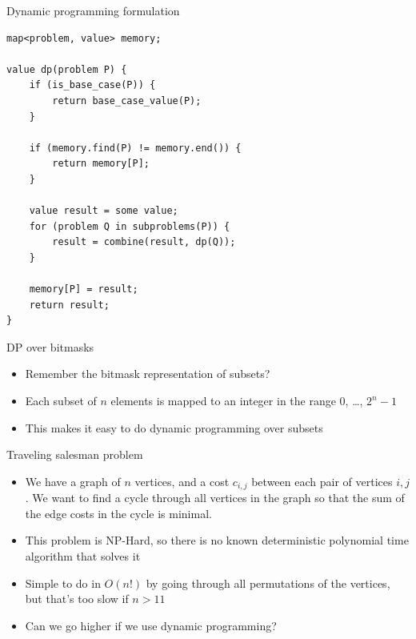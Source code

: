 \documentclass{beamer}
\begin{document}
\begin{frame}{Dynamic programming formulation}
    \begin{verbatim}
map<problem, value> memory;

value dp(problem P) {
    if (is_base_case(P)) {
        return base_case_value(P);
    }

    if (memory.find(P) != memory.end()) {
        return memory[P];
    }

    value result = some value;
    for (problem Q in subproblems(P)) {
        result = combine(result, dp(Q));
    }

    memory[P] = result;
    return result;
}
    \end{verbatim}
\end{frame}


\begin{frame}[plain]{DP over bitmasks}
    \vspace{40pt}
    \begin{itemize}
        \item Remember the bitmask representation of subsets?
        \item Each subset of $n$ elements is mapped to an integer in the range $0$, \ldots, $2^{n} - 1$
        \item This makes it easy to do dynamic programming over subsets
    \end{itemize}
\end{frame}

\begin{frame}[plain]{Traveling salesman problem}
    \vspace{10pt}

    \begin{itemize}
        \item We have a graph of $n$ vertices, and a cost $c_{i,j}$ between each pair of vertices $i, j$. We want to find a cycle through all vertices in the graph so that the sum of the edge costs in the cycle is minimal.

        \vspace{5pt}
        \item This problem is NP-Hard, so there is no known deterministic polynomial time algorithm that solves it

        \vspace{10pt}
        \item Simple to do in $O(n!)$ by going through all permutations of the vertices, but that's too slow if $n > 11$

        \vspace{10pt}
        \item Can we go higher if we use dynamic programming?
    \end{itemize}
\end{frame}
\end{document}
